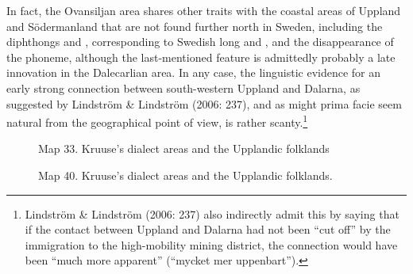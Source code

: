 In fact, the Ovansiljan area shares other traits with the coastal areas of Uppland and Södermanland that are not found further north in Sweden, including the diphthongs  and , corresponding to Swedish long  and , and the disappearance of the  phoneme, although the last-mentioned feature is admittedly probably a late innovation in the Dalecarlian area. In any case, the linguistic evidence for an early strong connection between south-western Uppland and Dalarna, as suggested by Lindström \& Lindström (2006: 237), and as might prima facie seem natural from the geographical point of view, is rather scanty.\footnote{ Lindström \& Lindström (2006: 237) also indirectly admit this by saying that if the contact between Uppland and Dalarna had not been “cut off” by the immigration to the high-mobility mining district, the connection would have been “much more apparent” (“mycket mer uppenbart”).}

\clearpage%


\begin{figure}[h]
\centering
\begin{minipage}{4.125in}
Map 33. Kruuse’s dialect areas and the Upplandic folklands


\end{minipage}
\end{figure}
 

\begin{figure}[h]
\centering
\begin{minipage}{4.92708in}
\label{bkm:Ref130722437}Map 40. Kruuse’s dialect areas and the Upplandic folklands.

\end{minipage}
\end{figure}
\clearpage%

